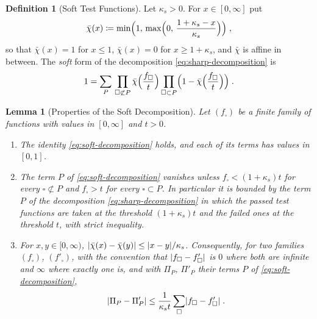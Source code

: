 \documentclass[11pt]{preprint}
\DeclarePairedDelimiter{\abs}{\lvert}{\rvert}
\numberwithin{equation}{section}
\newtheorem{lemma}[theorem]{Lemma}
\theoremstyle{definition}
\newtheorem{definition}[theorem]{Definition}
\theoremstyle{remark}
\theoremstyle{plain}
\begin{document}
\begin{definition}[Soft Test Functions]\label{def:soft-test-function}
Let $\kappa_s > 0$. For $x \in [0, \infty]$ put
\begin{equation}\label{eq:soft-function}
    \bar\chi(x) \coloneqq \min\Bigl(1,\, \max\Bigl(0,\, \frac{1 + \kappa_s - x}{\kappa_s}\Bigr)\Bigr)\;,
\end{equation}
so that $\bar\chi(x) = 1$ for $x \leq 1$, $\bar\chi(x) = 0$ for $x \geq 1 + \kappa_s$, and $\bar\chi$ is affine in between. The \emph{soft} form of the decomposition \eqref{eq:sharp-decomposition} is
\begin{equation}\label{eq:soft-decomposition}
    1 = \sum_{P}\,\prod_{\square \not\subset P}\bar\chi\Bigl(\frac{f_\square}{t}\Bigr)\prod_{\square \subset P}\Bigl(1 - \bar\chi\Bigl(\frac{f_\square}{t}\Bigr)\Bigr)\;.
\end{equation}
\end{definition}

\begin{lemma}[Properties of the Soft Decomposition]\label{lem:soft-decomposition}
Let $(f_\square)$ be a finite family of functions with values in $[0, \infty]$ and $t > 0$.
\begin{enumerate}[label=(\roman*)]
\item The identity \eqref{eq:soft-decomposition} holds, and each of its terms has values in $[0, 1]$.
\item The term $P$ of \eqref{eq:soft-decomposition} vanishes unless $f_\square < (1 + \kappa_s)t$ for every $\square \not\subset P$ and $f_\square > t$ for every $\square \subset P$. In particular it is bounded by the term $P$ of the decomposition \eqref{eq:sharp-decomposition} in which the passed test functions are taken at the threshold $(1 + \kappa_s)t$ and the failed ones at the threshold $t$, with strict inequality.
\item For $x, y \in [0, \infty)$, $\abs{\bar\chi(x) - \bar\chi(y)} \leq \abs{x - y}/\kappa_s$. Consequently, for two families $(f_\square)$, $(f'_\square)$, with the convention that $\abs{f_\square - f'_\square}$ is $0$ where both are infinite and $\infty$ where exactly one is, and with $\Pi_P$, $\Pi'_P$ their terms $P$ of \eqref{eq:soft-decomposition},
\begin{equation}\label{eq:soft-difference}
    \abs{\Pi_P - \Pi'_P} \leq \frac{1}{\kappa_st}\sum_{\square}\abs{f_\square - f'_\square}\;.
\end{equation}
\end{enumerate}
\end{lemma}
\end{document}
